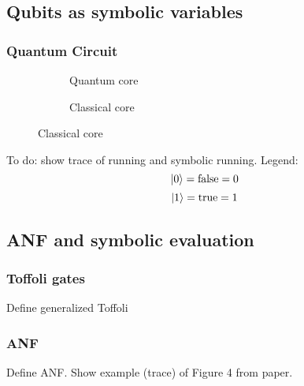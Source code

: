 \documentclass{beamer}
\begin{document}
\subsection[Symbolic]{Qubits as symbolic variables}
\begin{frame}
\frametitle{Quantum Circuit}

\begin{figure}[b]
  \centering
\begin{subfigure}[b]{.45\textwidth}
    \centering
\caption{\label{fig:bellqcore}Quantum core}
\end{subfigure}
\qquad
\begin{subfigure}[b]{.45\textwidth}
    \centering
\caption{\label{fig:bellccore}Classical core}
\end{subfigure}
\end{figure}

To do: show trace of running and symbolic running.
Legend:
  $$ \ket{0} = \text{false} = 0 $$
  $$ \ket{1} = \text{true} = 1 $$
\end{frame}


\subsection[ANF]{ANF and symbolic evaluation}

\begin{frame}
\frametitle{Toffoli gates}
Define generalized Toffoli
\end{frame}

\begin{frame}
\frametitle{ANF}
Define ANF. Show example (trace) of Figure 4 from paper. 
\end{frame}
\end{document}
